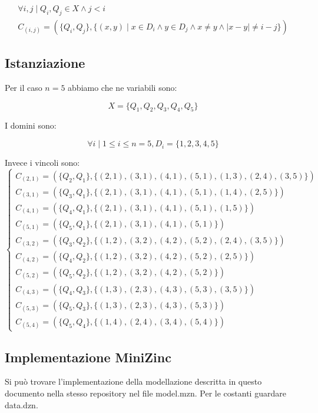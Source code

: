 \documentclass{article}
\begin{document}
\begin{multline}
    \forall i,j \mid Q_i,Q_j \in X \land j < i \quad \\
    C_{(i,j)} = 
    (
        \{Q_i,Q_j\}, \{(x,y) \mid x \in D_i \land y \in D_j \land x \not = y \land |x - y| \not = i - j\}
    )
\end{multline}

\subsection{Istanziazione}

Per il caso $n = 5$ abbiamo che ne variabili sono:

\begin{equation}
    X = \{Q_1, Q_2, Q_3, Q_4, Q_5\}
\end{equation}

I domini sono:

\begin{equation}
    \forall i \mid 1 \leq i \leq n = 5, D_i = \{1,2,3,4,5\}
\end{equation}

\newpage

Invece i vincoli sono:
\[
\begin{cases}
    C_{(2,1)} = (\{Q_2,Q_1\}, \{(2,1), (3,1), (4,1), (5,1), (1,3), (2,4), (3,5)\}) \\
    C_{(3,1)} = (\{Q_3,Q_1\}, \{(2,1), (3,1), (4,1), (5,1), (1,4), (2,5)\}) \\
    C_{(4,1)} = (\{Q_4,Q_1\}, \{(2,1), (3,1), (4,1), (5,1), (1,5)\}) \\
    C_{(5,1)} = (\{Q_5,Q_1\}, \{(2,1), (3,1), (4,1), (5,1)\}) \\
    C_{(3,2)} = (\{Q_3,Q_2\}, \{(1,2), (3,2), (4,2), (5,2), (2,4), (3,5)\}) \\
    C_{(4,2)} = (\{Q_4,Q_2\}, \{(1,2), (3,2), (4,2), (5,2), (2,5)\}) \\
    C_{(5,2)} = (\{Q_5,Q_2\}, \{(1,2), (3,2), (4,2), (5,2)\}) \\
    C_{(4,3)} = (\{Q_4,Q_3\}, \{(1,3), (2,3), (4,3), (5,3), (3,5)\}) \\
    C_{(5,3)} = (\{Q_5,Q_3\}, \{(1,3), (2,3), (4,3), (5,3)\}) \\
    C_{(5,4)} = (\{Q_5,Q_4\}, \{(1,4), (2,4), (3,4), (5,4)\}) 
\end{cases}
\]

\subsection{Implementazione MiniZinc}

Si può trovare l'implementazione della modellazione descritta in questo documento nella
stesso repository nel file model.mzn. Per le costanti guardare data.dzn.
\end{document}
